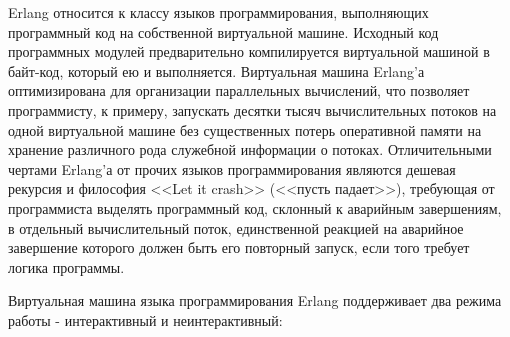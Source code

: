Erlang относится к классу языков программирования, выполняющих программный код на собственной виртуальной машине. Исходный код программных модулей предварительно компилируется виртуальной машиной в байт-код, который ею и выполняется. Виртуальная машина Erlang'а оптимизирована для организации параллельных вычислений, что позволяет программисту, к примеру, запускать десятки тысяч вычислительных потоков на одной виртуальной машине без существенных потерь оперативной памяти на хранение различного рода служебной информации о потоках. Отличительными чертами Erlang'а от прочих языков программирования являются дешевая рекурсия и философия <<Let it crash>> (<<пусть падает>>), требующая от программиста выделять программный код, склонный к аварийным завершениям, в отдельный вычислительный поток, единственной реакцией на аварийное завершение которого должен быть его повторный запуск, если того требует логика программы.


Виртуальная машина языка программирования Erlang поддерживает два режима работы - интерактивный и неинтерактивный:

